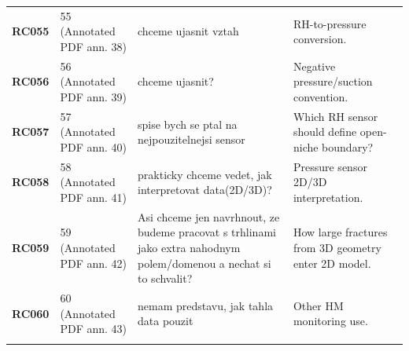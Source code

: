 \begin{longtable}{@{}L{0.10\textwidth} L{0.14\textwidth} L{0.31\textwidth} L{0.37\textwidth}@{}}
\addlinespace[0.16em]
\textbf{RC055} & 55 (Annotated PDF ann. 38) & chceme ujasnit vztah & RH-to-pressure conversion.\\
\addlinespace[0.16em]
\textbf{RC056} & 56 (Annotated PDF ann. 39) & chceme ujasnit? & Negative pressure/suction convention.\\
\addlinespace[0.16em]
\textbf{RC057} & 57 (Annotated PDF ann. 40) & spise bych se ptal na nejpouzitelnejsi sensor & Which RH sensor should define open-niche boundary?\\
\addlinespace[0.16em]
\textbf{RC058} & 58 (Annotated PDF ann. 41) & prakticky chceme vedet, jak interpretovat data(2D/3D)? & Pressure sensor 2D/3D interpretation.\\
\addlinespace[0.16em]
\textbf{RC059} & 59 (Annotated PDF ann. 42) & Asi chceme jen navrhnout, ze budeme pracovat s trhlinami jako extra nahodnym polem/domenou a nechat si to schvalit? & How large fractures from 3D geometry enter 2D model.\\
\addlinespace[0.16em]
\textbf{RC060} & 60 (Annotated PDF ann. 43) & nemam predstavu, jak tahla data pouzit & Other HM monitoring use.\\
\addlinespace[0.16em]
\end{longtable}
\normalsize
\fi
